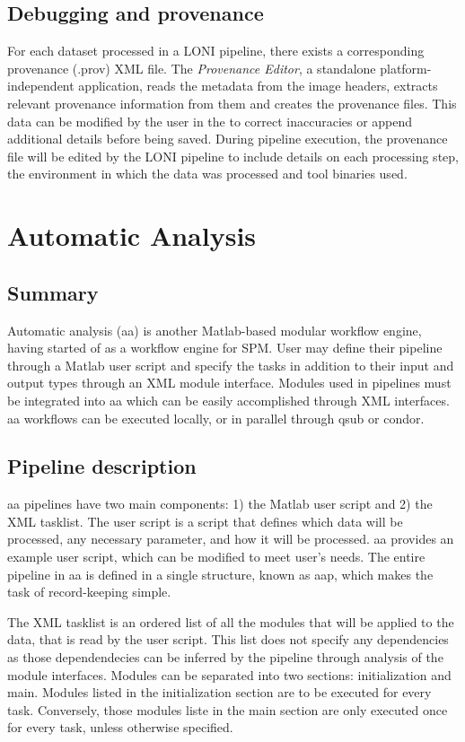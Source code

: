 \documentclass{report}
\begin{document}
        \subsection{Debugging and provenance}
        For each dataset processed in a LONI pipeline, there exists a corresponding
provenance (.prov) XML file. The \textit{Provenance Editor}, a standalone
platform-independent application, reads the metadata from the image headers,
extracts relevant provenance information from them and creates the provenance files. 
This data can be modified by the user in the to correct inaccuracies or append
additional details before being saved. During pipeline execution, the provenance
file will be edited by the LONI pipeline to include details on each processing
step, the environment in which the data was processed and tool binaries used. 

    \section{Automatic Analysis}
        \subsection{Summary}
        Automatic analysis (aa) is another Matlab-based modular workflow engine,
having started of as a workflow engine for SPM. User may define their pipeline
through a Matlab user script and specify the tasks in addition to their input
and output types through an XML module interface. Modules used in pipelines must
be integrated into aa which can be easily accomplished through XML interfaces.
aa workflows can be executed locally, or in parallel through qsub or condor.

        \subsection{Pipeline description}
        aa pipelines have two main components: 1) the Matlab user script and 2)
the XML tasklist. The user script is a script that defines which data will be
processed, any necessary parameter, and how it will be processed. aa provides an example user script,
which can be modified to meet user's needs. The entire pipeline in aa is defined
in a single structure, known as aap, which makes the task of record-keeping
simple.

        The XML tasklist is an ordered list of all the modules that will be applied to
the data, that is read by the user script. This list does not specify any
dependencies as those dependendecies can be inferred by the pipeline through
analysis of the module interfaces. Modules can be separated into two
sections: initialization and main. Modules listed in the initialization section
are to be executed for every task. Conversely, those modules liste in the main
section are only executed once for every task, unless otherwise specified.
\end{document}
